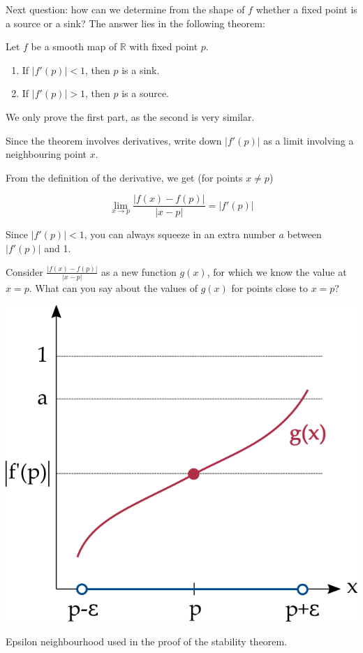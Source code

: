 \pagebreak


Next question: how can we determine from the shape of $f$ whether a fixed point is a source or a sink? The answer lies in the following theorem:

Let $f$ be a smooth map of $\mathbb{R}$ with fixed point $p$. 
\begin{enumerate}
\item
If $|f'(p)| < 1$, then $p$ is a sink.
\item 
If $|f'(p)| > 1$, then $p$ is a source. 
\end{enumerate}

We only prove the first part, as the second is very similar.

\begin{cue}
Since the theorem involves derivatives, write down $|f'(p)|$ as a limit involving a neighbouring point $x$.  
\end{cue}

From the definition of the derivative, we get (for points $x \ne p$)

\begin{equation}
\lim_{x \to p} \frac{\left|f(x)-f(p)\right|}{|x-p|} = \left|f'(p)\right|
\end{equation} 

Since $|f'(p)| < 1$, you can always squeeze in an extra number $a$ between $|f'(p)|$ and 1.

\begin{cue}
Consider $\frac{\left|f(x)-f(p)\right|}{|x-p|}$ as a new function $g(x)$, for which we know the value at $x=p$. What can you say about the values of $g(x)$ for points close to $x=p$?  
\end{cue}

\begin{marginfigure}
\centering
\includegraphics{dynamic/figures/stab}
\caption{Epsilon neighbourhood used in the proof of the stability theorem.}
\label{fig-eps-stab}
\end{marginfigure}

